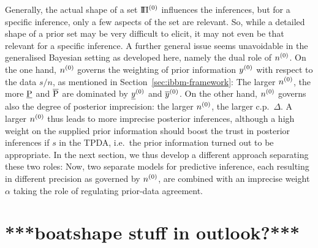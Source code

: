 Generally, the actual shape of a set $\text{I}\!\Pi^{(0)}$ influences the inferences,
but for a specific inference, only a few aspects of the set are relevant. So, while
a detailed shape of a prior set may be very difficult to elicit, it may not
even be that relevant for a specific inference. A further general issue seems unavoidable in the
generalised Bayesian setting as developed here, namely the dual role of $n^{(0)}$. On the one
hand, $n^{(0)}$ governs the weighting of prior information $y^{(0)}$ with
respect to the data $s/n$, as mentioned in
Section~\ref{sec:ibbm-framework}: The larger $n^{(0)}$, the more
$\underline{\operatorname{P}}$ and $\overline{\operatorname{P}}$ are dominated by $\underline{y}^{(0)}$ and $\overline{y}^{(0)}$. On
the other hand, $n^{(0)}$ governs also the degree of posterior
imprecision: the larger $n^{(0)}$, the larger c.p.\ $\Delta$. A larger
$n^{(0)}$ thus leads to more imprecise posterior inferences, although a
high weight on the supplied prior information should boost the trust
in posterior inferences if $s$ in the TPDA, i.e.\ the prior
information turned out to be appropriate. In the next section,
we thus develop a different approach separating these two
roles: Now, two separate models for predictive inference, each
resulting in different precision as governed by $n^{(0)}$,
are combined with an imprecise weight $\alpha$ %
taking the role of regulating prior-data agreement.




\section{***boatshape stuff in outlook?***}



